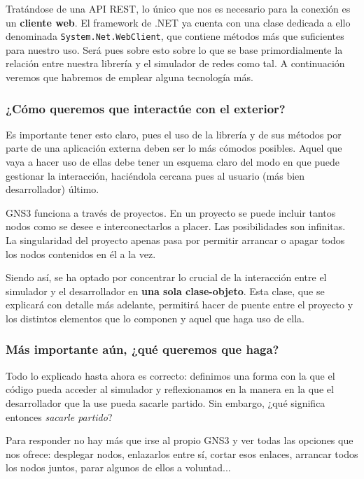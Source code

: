 Tratándose de una API REST, lo único que nos es necesario para la conexión es un \textbf{cliente web}. El framework de .NET ya cuenta con una clase dedicada a ello denominada \texttt{System.Net.WebClient}, que contiene métodos más que suficientes para nuestro uso\cite{webclient}. Será pues sobre esto sobre lo que se base primordialmente la relación entre nuestra librería y el simulador de redes como tal. A continuación veremos que habremos de emplear alguna tecnología más.

\subsubsection[''Acceso a la API'']{¿Cómo queremos que interactúe con el exterior?}\label{subsec:accesoapi}
Es importante tener esto claro, pues el uso de la librería y de sus métodos por parte de una aplicación externa deben ser lo más cómodos posibles. Aquel que vaya a hacer uso de ellas debe tener un esquema claro del modo en que puede gestionar la interacción, haciéndola cercana pues al usuario (más bien desarrollador) último.

GNS3 funciona a través de proyectos. En un proyecto se puede incluir tantos nodos como se desee e interconectarlos a placer. Las posibilidades son infinitas. La singularidad del proyecto apenas pasa por permitir arrancar o apagar todos los nodos contenidos en él a la vez.

Siendo así, se ha optado por concentrar lo crucial de la interacción entre el simulador y el desarrollador en \textbf{una sola clase-objeto}. Esta clase, que se explicará con detalle más adelante, permitirá hacer de puente entre el proyecto y los distintos elementos que lo componen y aquel que haga uso de ella.

\subsubsection[''Utilidad'']{Más importante aún, ¿qué queremos que haga?}
Todo lo explicado hasta ahora es correcto: definimos una forma con la que el código pueda acceder al simulador y reflexionamos en la manera en la que el desarrollador que la use pueda sacarle partido. Sin embargo, ¿qué significa entonces \textit{sacarle partido}?

Para responder no hay más que irse al propio GNS3 y ver todas las opciones que nos ofrece: desplegar nodos, enlazarlos entre sí, cortar esos enlaces, arrancar todos los nodos juntos, parar algunos de ellos a voluntad... 

